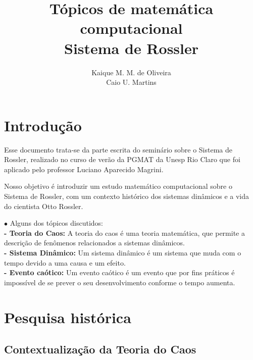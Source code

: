 \documentclass[12pt,a4paper]{article} %
\title{Tópicos de matemática computacional \\ Sistema de Rossler}
\author{Kaique M. M. de Oliveira \\ Caio U. Martins}
\theoremstyle{definition}
\numberwithin{equation}{ex}
\theoremstyle{definition}
\begin{document}
\maketitle
\date{}

\section{Introdução}
Esse documento trata-se da parte escrita do seminário sobre o Sistema de Rossler, realizado no curso de verão da PGMAT da Unesp Rio Claro que foi aplicado pelo professor Luciano Aparecido Magrini.

Nosso objetivo é introduzir um estudo matemático computacional sobre o Sistema de Rossler, com um contexto histórico dos sistemas dinâmicos e a vida do cientista Otto Rossler.

\item [$\bullet$] Alguns dos tópicos discutidos: \\

\textbf{- Teoria do Caos:} A teoria do caos é uma teoria matemática, que permite a descrição de fenômenos relacionados a sistemas dinâmicos. \\

\textbf{- Sistema Dinâmico:} Um sistema dinâmico é um sistema que muda com o tempo devido a uma causa e um efeito. \\

\textbf{- Evento caótico:} Um evento caótico é um evento que por fins práticos é impossível de se prever o seu desenvolvimento conforme o tempo aumenta.



\section{Pesquisa histórica}

\subsection{Contextualização da Teoria do Caos}
\end{document}
